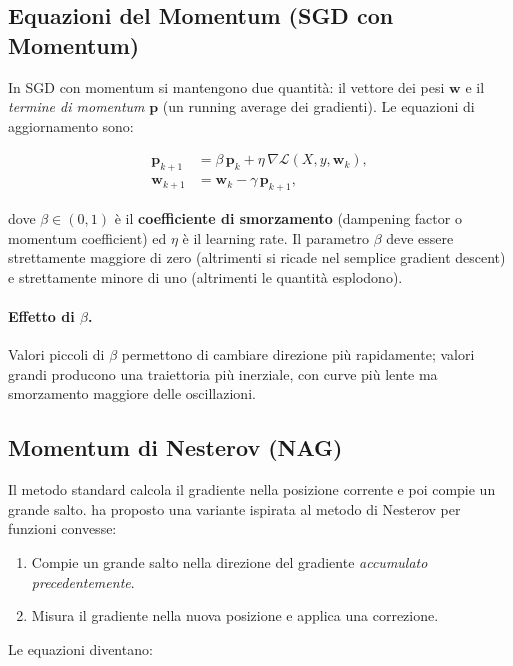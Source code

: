 \subsection{Equazioni del Momentum (SGD con Momentum)}
\label{subsec:momentum-equations}

In SGD con momentum si mantengono due quantità: il vettore dei pesi $\mathbf{w}$
e il \emph{termine di momentum} $\mathbf{p}$ (un running average dei gradienti).
Le equazioni di aggiornamento sono:

\begin{align}
  \mathbf{p}_{k+1} &= \beta\,\mathbf{p}_k + \eta\,\nabla\mathcal{L}(X, y, \mathbf{w}_k), \\
  \mathbf{w}_{k+1} &= \mathbf{w}_k - \gamma\,\mathbf{p}_{k+1},
\end{align}

dove $\beta \in (0,1)$ è il \textbf{coefficiente di smorzamento} (dampening
factor o momentum coefficient) ed $\eta$ è il learning rate. Il parametro $\beta$
deve essere strettamente maggiore di zero (altrimenti si ricade nel semplice
gradient descent) e strettamente minore di uno (altrimenti le quantità
esplodono).

\paragraph{Effetto di $\beta$.}
Valori piccoli di $\beta$ permettono di cambiare direzione più rapidamente;
valori grandi producono una traiettoria più inerziale, con curve più lente ma
smorzamento maggiore delle oscillazioni.

\subsection{Momentum di Nesterov (NAG)}
\label{subsec:nesterov}

Il metodo standard calcola il gradiente nella posizione corrente e poi compie un
grande salto. \citet{sutskever2012} ha proposto una variante ispirata al metodo
di Nesterov per funzioni convesse:

\begin{enumerate}
  \item Compie un grande salto nella direzione del gradiente \emph{accumulato
        precedentemente}.
  \item Misura il gradiente nella nuova posizione e applica una correzione.
\end{enumerate}

Le equazioni diventano:

